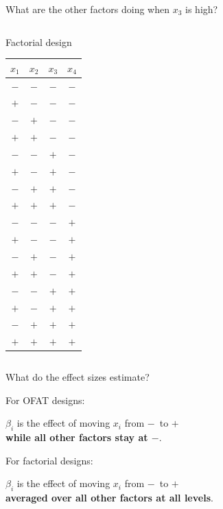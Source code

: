 \documentclass[10pt]{beamer}
\newcommand\lo{\ensuremath{\boldsymbol{-}}}
\newcommand\hi{\ensuremath{\boldsymbol{+}}}
\begin{document}
\begin{frame}{What are the other factors doing when \(x_3\) is high?}
\begin{columns}
\begin{column}{0.45\textwidth}
\begin{center}
Factorial design
\begin{tabular}{cccc}
$x_1$ & $x_2$ & $x_3$ & $x_4$ \\
\hline
\lo & \lo & \lo & \lo \\
\hi & \lo & \lo & \lo \\
\lo & \hi & \lo & \lo \\
\hi & \hi & \lo & \lo \\
\rowcolor{pink} \lo & \lo & \hi & \lo \\
\rowcolor{pink} \hi & \lo & \hi & \lo \\
\rowcolor{pink} \lo & \hi & \hi & \lo \\
\rowcolor{pink} \hi & \hi & \hi & \lo \\
\lo & \lo & \lo & \hi \\
\hi & \lo & \lo & \hi \\
\lo & \hi & \lo & \hi \\
\hi & \hi & \lo & \hi \\
\rowcolor{pink} \lo & \lo & \hi & \hi \\
\rowcolor{pink} \hi & \lo & \hi & \hi \\
\rowcolor{pink} \lo & \hi & \hi & \hi \\
\rowcolor{pink} \hi & \hi & \hi & \hi \\
\end{tabular}
\end{center}
\end{column}

\end{columns}
\end{frame}

\begin{frame}{What do the effect sizes estimate?}

For OFAT designs:
\begin{center}
	 $\beta_i$ is the effect of moving $x_i$ from \lo\ to \hi\ \\ \textbf{while all other factors stay at \lo}.
\end{center}

\pause
\bigskip
For factorial designs:
\begin{center}
	 $\beta_i$ is the effect of moving $x_i$ from \lo\ to \hi\ \\ \textbf{averaged over all other factors at all levels}.
\end{center}
	
\end{frame}
\end{document}
